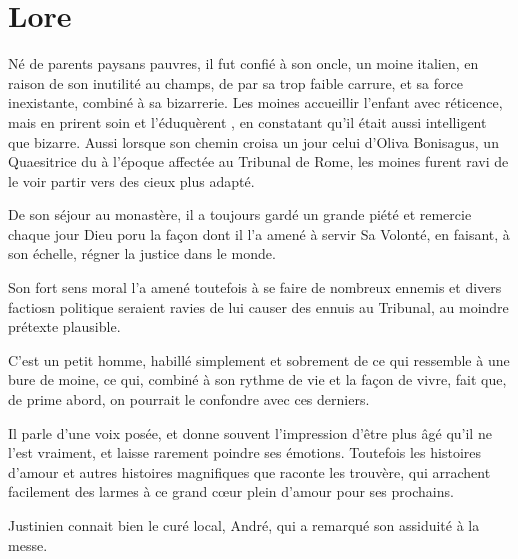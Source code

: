 
\section*{Lore}
Né de parents paysans pauvres, il fut confié à son oncle, un moine italien, en raison de son inutilité au champs, de par sa trop faible carrure, et sa force inexistante, combiné à sa bizarrerie. Les moines accueillir l'enfant avec réticence, mais en prirent soin et l'éduquèrent , en constatant qu'il était aussi intelligent que bizarre. Aussi lorsque son chemin croisa un jour celui d'Oliva Bonisagus, un Quaesitrice du à l'époque affectée au Tribunal de Rome, les moines furent ravi de le voir partir vers des cieux plus adapté.

De son séjour au monastère, il a toujours gardé un grande piété et remercie chaque jour Dieu poru la façon dont il l'a amené à servir Sa Volonté, en faisant, à son échelle, régner la justice dans le monde.

Son fort sens moral l'a amené toutefois à se faire de nombreux ennemis et divers factiosn politique seraient ravies de lui causer des ennuis au Tribunal, au moindre prétexte plausible.

C'est un petit homme, habillé simplement et sobrement de ce qui ressemble à une bure de moine, ce qui, combiné à son rythme de vie et la façon de vivre, fait que, de prime abord, on pourrait le confondre avec ces derniers.

Il parle d'une voix posée, et donne souvent l'impression d'être plus âgé qu'il ne l'est vraiment, et laisse rarement poindre ses émotions. Toutefois les histoires d'amour et autres histoires magnifiques que raconte les trouvère, qui arrachent facilement des larmes à ce grand cœur plein d'amour pour ses prochains.

Justinien connait bien le curé local, André, qui a remarqué son assiduité à la messe.

